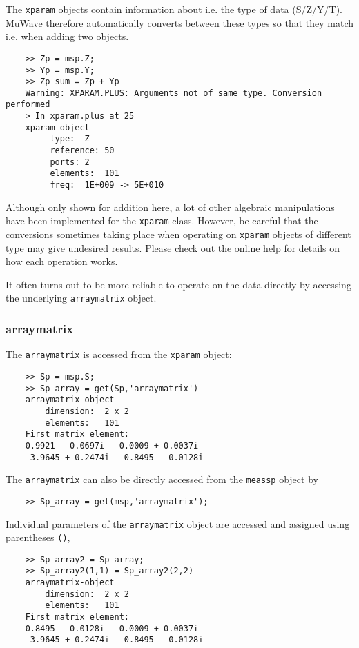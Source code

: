 The \verb"xparam" objects contain information about i.e. the type
of data (S/Z/Y/T). MuWave therefore automatically converts between
these types so that they match i.e. when adding two objects.
\begin{small}
\begin{verbatim}
    >> Zp = msp.Z;
    >> Yp = msp.Y;
    >> Zp_sum = Zp + Yp
    Warning: XPARAM.PLUS: Arguments not of same type. Conversion performed
    > In xparam.plus at 25
    xparam-object
    	 type:	Z
    	 reference:	50
    	 ports:	2
    	 elements:	101
    	 freq:	1E+009 -> 5E+010
\end{verbatim}
\end{small}
Although only shown for addition here, a lot of other algebraic
manipulations have been implemented for the \verb"xparam" class.
However, be careful that the conversions sometimes taking place
when operating on \verb"xparam" objects of different type may give
undesired results. Please check out the online help for details on
how each operation works.

It often turns out to be more reliable to operate on the data
directly by accessing the underlying \verb"arraymatrix" object.

\subsubsection{arraymatrix}
The \verb"arraymatrix" is accessed from the \verb"xparam" object:
\begin{small}
\begin{verbatim}
    >> Sp = msp.S;
    >> Sp_array = get(Sp,'arraymatrix')
    arraymatrix-object
        dimension:  2 x 2
        elements:   101
    First matrix element:
    0.9921 - 0.0697i   0.0009 + 0.0037i
    -3.9645 + 0.2474i   0.8495 - 0.0128i
\end{verbatim}
\end{small}
The \verb"arraymatrix" can also be directly accessed from the
\verb"meassp" object by
\begin{small}
\begin{verbatim}
    >> Sp_array = get(msp,'arraymatrix');
\end{verbatim}
\end{small}

Individual parameters of the \verb"arraymatrix" object are
accessed and assigned using parentheses \verb"()",
\begin{small}
\begin{verbatim}
    >> Sp_array2 = Sp_array;
    >> Sp_array2(1,1) = Sp_array2(2,2)
    arraymatrix-object
        dimension:  2 x 2
        elements:   101
    First matrix element:
    0.8495 - 0.0128i   0.0009 + 0.0037i
    -3.9645 + 0.2474i   0.8495 - 0.0128i
\end{verbatim}
\end{small}

